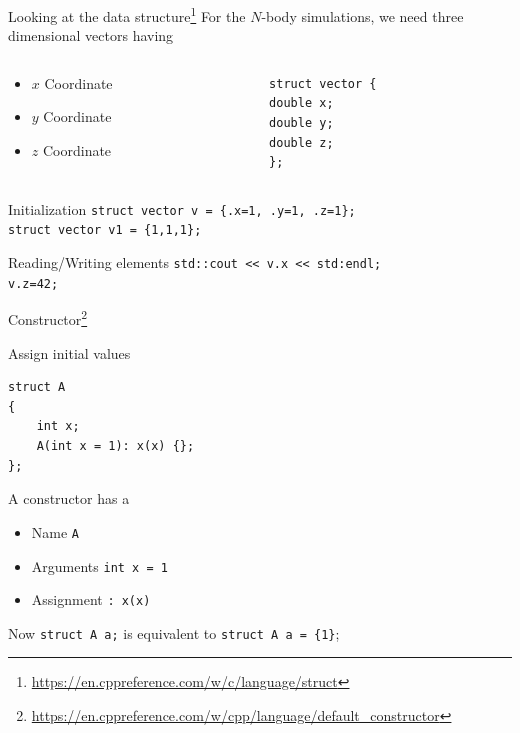 \documentclass[\classoption]{beamer}
\begin{document}
\begin{frame}[fragile]{Looking at the data structure\footnote{\tiny\url{https://en.cppreference.com/w/c/language/struct}}}
For the $N$-body simulations, we need three dimensional vectors having
\begin{columns}
\begin{column}{0.5\textwidth}
\begin{itemize}
\item $x$ Coordinate
\item $y$ Coordinate
\item $z$ Coordinate
\end{itemize}
\end{column}
\begin{column}{0.5\textwidth}  %
\begin{lstlisting}
struct vector {
double x;
double y;
double z;
};
\end{lstlisting}
\end{column}
\end{columns} 
\begin{block}{Initialization}
\lstinline|struct vector v = {.x=1, .y=1, .z=1};| \\
\lstinline|struct vector v1 = {1,1,1};|
\end{block}

\begin{block}{Reading/Writing elements }
\lstinline|std::cout << v.x << std:endl;| \\
\lstinline|v.z=42;|
\end{block}
\end{frame}

\begin{frame}[fragile]{Constructor\footnote{\tiny\url{https://en.cppreference.com/w/cpp/language/default_constructor}}}
\begin{block}{Assign initial values}
\begin{lstlisting}
struct A
{
    int x;
    A(int x = 1): x(x) {};
};
\end{lstlisting}
\end{block}

\begin{block}{A constructor has a}
\begin{itemize}
\item Name \lstinline|A| 
\item Arguments \lstinline|int x = 1|
\item Assignment \lstinline|: x(x)|
\end{itemize}
Now \lstinline|struct A a;| is equivalent to \lstinline|struct A a = {1}|;
\end{block}

\end{frame}
\end{document}
